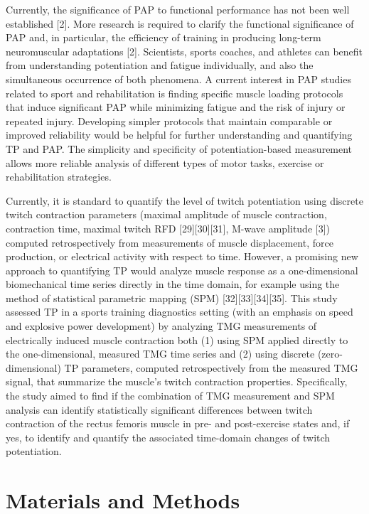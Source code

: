 \documentclass[utf8]{style/FrontiersinHarvard}
\begin{document}
Currently, the significance of PAP to functional performance has not been well established [2].
More research is required to clarify the functional significance of PAP and, in particular, the efficiency of training in producing long-term neuromuscular adaptations [2].
Scientists, sports coaches, and athletes can benefit from understanding potentiation and fatigue individually, and also the simultaneous occurrence of both phenomena. %
A current interest in PAP studies related to sport and rehabilitation is finding specific muscle loading protocols that induce significant PAP while minimizing fatigue and the risk of injury or repeated injury. %
Developing simpler protocols that maintain comparable or improved reliability would be helpful for further understanding and quantifying TP and PAP. %
The simplicity and specificity of potentiation-based measurement allows more reliable analysis of different types of motor tasks, exercise or rehabilitation strategies.

Currently, it is standard to quantify the level of twitch potentiation using discrete twitch contraction parameters (maximal amplitude of muscle contraction, contraction time, maximal twitch RFD [29][30][31], M-wave amplitude [3]) computed retrospectively from measurements of muscle displacement, force production, or electrical activity with respect to time.
However, a promising new approach to quantifying TP would analyze 
muscle response as a one-dimensional biomechanical time series directly in the time domain,
for example using the method of statistical parametric mapping (SPM) [32][33][34][35].
This study assessed TP in a sports training diagnostics setting (with an emphasis on speed and explosive power development) by analyzing TMG measurements of electrically induced muscle contraction both
(1) using SPM applied directly to the one-dimensional, measured TMG time series and 
(2) using discrete (zero-dimensional) TP parameters, computed retrospectively from the measured TMG signal, that summarize the muscle's twitch contraction properties.
Specifically, the study aimed to find if the combination of TMG measurement and SPM analysis can identify statistically significant differences between twitch contraction of the rectus femoris muscle in pre- and post-exercise states and, if yes, to identify and quantify the associated time-domain changes of twitch potentiation.

\section{Materials and Methods}
\end{document}
